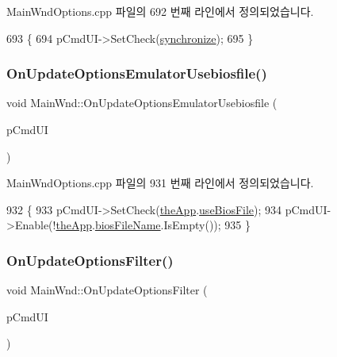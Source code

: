 Main\+Wnd\+Options.\+cpp 파일의 692 번째 라인에서 정의되었습니다.


\begin{DoxyCode}
693 \{
694   pCmdUI->SetCheck(\mbox{\hyperlink{_globals_8cpp_ac7839c270877c700179f026cb3217a6b}{synchronize}});
695 \}
\end{DoxyCode}
\mbox{\label{class_main_wnd_a602a9a86e5cc8e903fbf201a4478a3bc}} 
\subsubsection{\texorpdfstring{On\+Update\+Options\+Emulator\+Usebiosfile()}{OnUpdateOptionsEmulatorUsebiosfile()}}
{\footnotesize\ttfamily void Main\+Wnd\+::\+On\+Update\+Options\+Emulator\+Usebiosfile (\begin{DoxyParamCaption}\item[{C\+Cmd\+UI $\ast$}]{p\+Cmd\+UI }\end{DoxyParamCaption})\hspace{0.3cm}{\ttfamily [protected]}}



Main\+Wnd\+Options.\+cpp 파일의 931 번째 라인에서 정의되었습니다.


\begin{DoxyCode}
932 \{
933   pCmdUI->SetCheck(\mbox{\hyperlink{_v_b_a_8cpp_a8095a9d06b37a7efe3723f3218ad8fb3}{theApp}}.\mbox{\hyperlink{class_v_b_a_a0ad579388cd52cc4df5fadc560f27a37}{useBiosFile}});
934   pCmdUI->Enable(!\mbox{\hyperlink{_v_b_a_8cpp_a8095a9d06b37a7efe3723f3218ad8fb3}{theApp}}.\mbox{\hyperlink{class_v_b_a_a7bc70f5f75c0e2e3e2b1b63411af4559}{biosFileName}}.IsEmpty());
935 \}
\end{DoxyCode}
\mbox{\label{class_main_wnd_aa85c55f64e32373f8478ca899aa31ba7}} 
\subsubsection{\texorpdfstring{On\+Update\+Options\+Filter()}{OnUpdateOptionsFilter()}}
{\footnotesize\ttfamily void Main\+Wnd\+::\+On\+Update\+Options\+Filter (\begin{DoxyParamCaption}\item[{C\+Cmd\+UI $\ast$}]{p\+Cmd\+UI }\end{DoxyParamCaption})}



